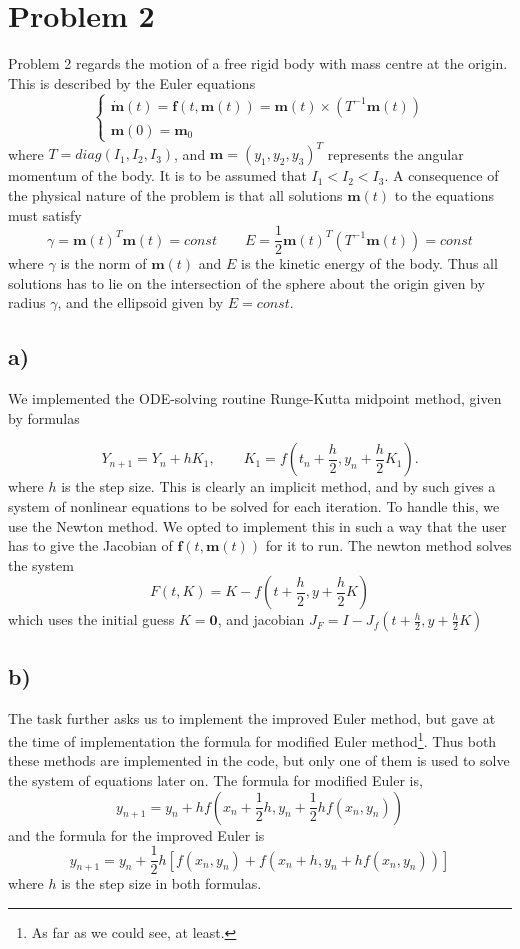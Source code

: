\documentclass[12pt, a4paper,usenames,dvipsnames]{article}
\renewcommand\vec{\mathbf}
\begin{document}
\section*{Problem 2}
Problem 2 regards the motion of a free rigid body with mass centre at the origin. This is described by the Euler equations
\[\left\{\begin{array}{l}
    \dot{ \vec{m}}(t)=\vec{f}(t,\vec{m}(t))=\vec{m}(t)\times({T^{-1}}\vec{m}(t))   \\
    \vec{m}(0)=\vec{m}_0  
\end{array}\right.\]
where \(T=diag(I_1,I_2,I_3)\), and \(\vec{m}=(y_1,y_2,y_3)^T\) represents the angular momentum of the body. It is to be assumed that \(I_1<I_2<I_3\). A consequence of the physical nature of the problem is that all solutions \(\vec{m}(t)\) to the equations must satisfy 
\[\gamma=\vec{m}(t)^T\vec{m}(t)=const\qquad E=\frac{1}{2}\vec{m}(t)^T(T^{-1}\vec{m}(t))=const\]
where \(\gamma\) is the norm of \(\vec{m}(t)\) and \(E\) is the kinetic energy of the body. Thus all solutions has to lie on the intersection of the sphere about the origin given by radius \(\gamma\), and the ellipsoid given by \(E=const\). 
\subsection*{a)}
We implemented the ODE-solving routine Runge-Kutta midpoint method, given by formulas

\[Y_{n+1} = Y_n +  hK_1, \qquad K_1=f(t_n + \frac{h}{2}, y_n+\frac{h}{2}K_1).\]
where \(h\) is the step size. This is clearly an implicit method, and by such gives a system of nonlinear equations to be solved for each iteration. To handle this, we use the Newton method. We opted to implement this in such a way that the user has to give the Jacobian of \(\vec{f}(t,\vec{m}(t))\) for it to run. The newton method solves the system
\[F(t,K)=K-f(t+\frac{h}{2},y+\frac{h}{2}K)\]
which uses the initial guess \(K=\vec{0}\), and jacobian \(J_F=I-J_f(t+\frac{h}{2},y+\frac{h}{2}K)\)

\subsection*{b)}
The task further asks us to implement the improved Euler method, but gave at the time of implementation the formula for modified Euler method\footnote{As far as we could see, at least.}. Thus both these methods are implemented in the code, but only one of them is used to solve the system of equations later on.
The formula for modified Euler is,
\[y_{n+1} = y_n + hf\left(x_n + \frac{1}{2}h, y_n + \frac{1}{2}hf(x_n, y_n)\right)\]
and the formula for the improved Euler is
\[y_{n+1} = y_n + \frac{1}{2}h[f(x_n,y_n) + f(x_n + h, y_n + hf(x_n, y_n))]\]
where $h$ is the step size in both formulas. 
\end{document}
